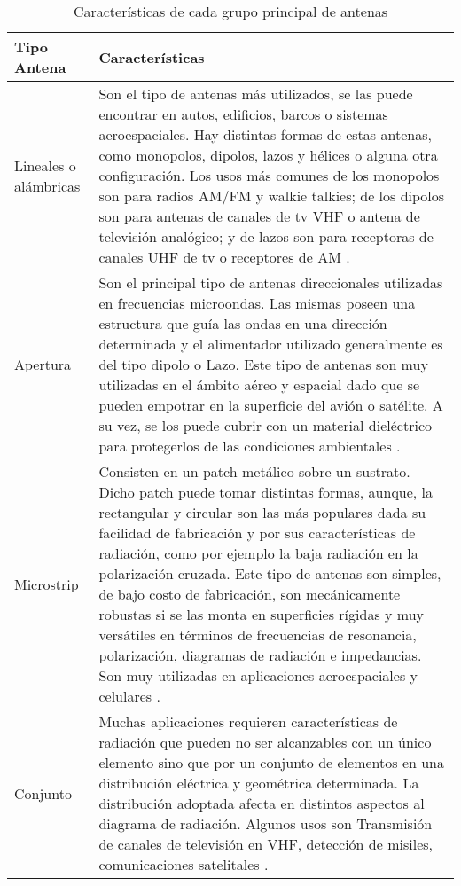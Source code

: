 \begin{table}[H]
  \caption{Características de cada grupo principal de antenas}
  \footnotesize
  \centering
  \begin{tabular}{p{1.9cm} p{12.5cm}}
  \toprule
  \textbf{Tipo Antena} & \textbf{Características} \tabularnewline
  \midrule
  Lineales o \newline alámbricas & Son el tipo de antenas más utilizados, se las puede encontrar en autos, edificios, barcos o sistemas aeroespaciales. Hay distintas formas de estas antenas, como monopolos, dipolos, lazos y hélices o alguna otra configuración. Los usos más comunes de los monopolos son para radios AM/FM y walkie talkies; de los dipolos son para antenas de canales de tv VHF o antena de televisión analógico; y de lazos son para receptoras de canales UHF de tv o receptores de AM \cite{Balanis2012}. \tabularnewline

  Apertura & Son el principal tipo de antenas direccionales utilizadas en frecuencias microondas. Las mismas poseen una estructura que guía las ondas en una dirección determinada y el alimentador utilizado generalmente es del tipo dipolo o Lazo. Este tipo de antenas son muy utilizadas en el ámbito aéreo y espacial dado que se pueden empotrar en la superficie del avión o satélite. A su vez, se los puede cubrir con un material dieléctrico para protegerlos de las condiciones ambientales \cite{Balanis2012}. \tabularnewline
  
  Microstrip & Consisten en un patch metálico sobre un sustrato. Dicho patch puede tomar distintas formas, aunque, la rectangular y circular son las más populares dada su facilidad de fabricación y por sus características de radiación, como por ejemplo la baja radiación en la polarización cruzada. Este tipo de antenas son simples, de bajo costo de fabricación, son mecánicamente robustas si se las monta en superficies rígidas y muy versátiles en términos de frecuencias de resonancia, polarización, diagramas de radiación e impedancias. Son muy utilizadas en aplicaciones aeroespaciales y celulares \cite{Balanis2012}. \tabularnewline

  Conjunto & Muchas aplicaciones requieren características de radiación que pueden no ser alcanzables con un único elemento sino que por un conjunto de elementos en una distribución eléctrica y geométrica determinada. La distribución adoptada afecta en distintos aspectos al diagrama de radiación. Algunos usos son Transmisión de canales de televisión en VHF, detección de misiles, comunicaciones satelitales \cite{Balanis2012}. \tabularnewline
  

\end{tabular}
\end{table}
